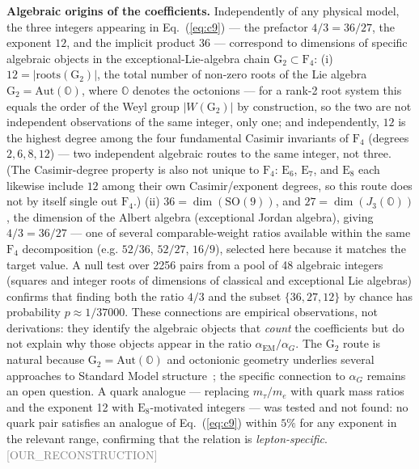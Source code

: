 \documentclass[twocolumn,prd,amsmath,amssymb,floatfix]{revtex4-2}
\newcommand{\reconstruction}{\textcolor{gray}{\small[OUR\_RECONSTRUCTION]}}
\begin{document}
\textbf{Algebraic origins of the coefficients.}
Independently of any physical model, the three integers appearing in
Eq.~(\ref{eq:c9}) --- the prefactor $4/3 = 36/27$, the exponent $12$, and
the implicit product $36$ --- correspond to dimensions of specific algebraic
objects in the exceptional-Lie-algebra chain $\mathrm{G}_2 \subset \mathrm{F}_4$:
(i) $12 = |\text{roots}(\mathrm{G}_2)|$, the total number of non-zero roots of
the Lie algebra $\mathrm{G}_2 = \mathrm{Aut}(\mathbb{O})$, where $\mathbb{O}$
denotes the octonions \cite{slansky1981} --- for a rank-2 root system this
equals the order of the Weyl group $|W(\mathrm{G}_2)|$ by construction, so the
two are not independent observations of the same integer, only one; and
independently, $12$ is the highest degree among the four fundamental Casimir
invariants of $\mathrm{F}_4$ (degrees $2, 6, 8, 12$) \cite{bincer1993f4casimir}
--- two independent algebraic routes to the same integer, not three. (The
Casimir-degree property is also not unique to $\mathrm{F}_4$: $\mathrm{E}_6$,
$\mathrm{E}_7$, and $\mathrm{E}_8$ each likewise include $12$ among their own
Casimir/exponent degrees, so this route does not by itself single out
$\mathrm{F}_4$.)
(ii) $36 = \dim(\mathrm{SO}(9))$, and $27 = \dim(J_3(\mathbb{O}))$, the dimension
of the Albert algebra (exceptional Jordan algebra), giving $4/3 = 36/27$ ---
one of several comparable-weight ratios available within the same $\mathrm{F}_4$
decomposition (e.g. $52/36$, $52/27$, $16/9$), selected here because it matches
the target value.
A null test over 2256 pairs from a pool of 48 algebraic integers (squares and
integer roots of dimensions of classical and exceptional Lie algebras)
confirms that finding both the ratio $4/3$ and the subset $\{36,27,12\}$ by
chance has probability $p\approx 1/37000$.
These connections are empirical observations, not derivations: they identify
the algebraic objects that \emph{count} the coefficients but do not explain
why those objects appear in the ratio $\alpha_\mathrm{EM}/\alpha_G$.
The $\mathrm{G}_2$ route is natural because $\mathrm{G}_2 = \mathrm{Aut}(\mathbb{O})$
and octonionic geometry underlies several approaches to Standard Model
structure~\cite{baezhuerta2010, todorov2018}; the specific connection
to $\alpha_G$ remains an open question.
A quark analogue --- replacing $m_\tau/m_e$ with quark mass ratios and the
exponent 12 with $\mathrm{E}_8$-motivated integers --- was tested and not found:
no quark pair satisfies an analogue of Eq.~(\ref{eq:c9}) within $5\%$ for
any exponent in the relevant range, confirming that the relation is
\emph{lepton-specific}.
\reconstruction
\end{document}
